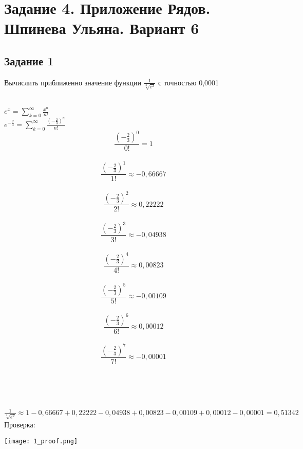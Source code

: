 \linespread{1.3}
\section{Задание 4. Приложение Рядов. Шпинева Ульяна. Вариант 6}
\subsection{Задание 1}
Вычислить приближенно значение функции $ \frac{1}{\sqrt[3]{e^2}} $ с точностью 0,0001\\
\begin{flushright}
\begin{minipage}{15cm}
	\\
	$e^x =  \sum_{k=0}^{\infty} \frac{x^n}{n!}$\\
	$e^{-\frac{2}{3}} =  \sum_{k=0}^{\infty} \frac{(-\frac{2}{3})^n}{n!}$\\
	$$\frac{(-\frac{2}{3})^0}{0!} = 1$$\\
	$$  \frac{(-\frac{2}{3})^1}{1!} \approx -0,66667 $$\\
	$$\frac{(-\frac{2}{3})^2}{2!} \approx 0,22222$$\\
	$$\frac{(-\frac{2}{3})^3}{3!} \approx -0,04938$$\\
	$$\frac{(-\frac{2}{3})^4}{4!} \approx 0,00823$$\\
	$$\frac{(-\frac{2}{3})^5}{5!} \approx -0,00109$$\\
	$$\frac{(-\frac{2}{3})^6}{6!} \approx 0,00012$$\\
	$$\frac{(-\frac{2}{3})^7}{7!} \approx -0,00001$$\\
\end{minipage}\\
\end{flushright}
	\\
	 $ \frac{1}{\sqrt[3]{e^2}} \approx 1 - 0,66667 + 0,22222 - 0,04938 + 0,00823 - 0,00109 + 0,00012 - 0,00001 = 0,51342 $\\

Проверка:
\begin{center}
	\texttt{[image: 1\_proof.png]}\quad
\end{center}
\newpage
